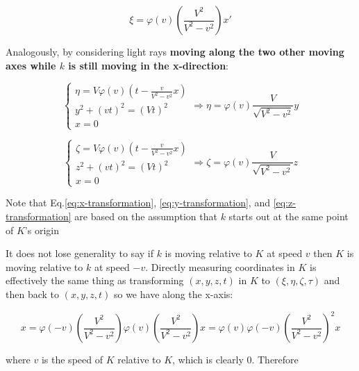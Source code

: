 \begin{equation}\label{eq:x-transformation}
    \xi = \varphi(v)\left( \frac{V^2}{V^2 - v^2} \right) x'
\end{equation}

Analogously, by considering light rays \textbf{moving along the two other moving axes while $k$ is still moving in the
x-direction}:

\begin{equation}\label{eq:y-transformation}
    \left\{
    \begin{array}{l}
        \eta = V\varphi(v)\left( t - \frac{v}{V^2 - v^2} x \right) \\
        y^2 + (vt)^2 = (Vt)^2 \\
        x = 0
    \end{array}
    \right.
    \Rightarrow
    \eta = \varphi(v)\frac{V}{\sqrt{V^2 - v^2}}y
\end{equation}

\begin{equation}\label{eq:z-transformation}
    \left\{
    \begin{array}{l}
        \zeta = V\varphi(v)\left( t - \frac{v}{V^2 - v^2} x \right) \\
        z^2 + (vt)^2 = (Vt)^2 \\
        x = 0
    \end{array}
    \right.
    \Rightarrow
    \zeta = \varphi(v)\frac{V}{\sqrt{V^2 - v^2}}z
\end{equation}

Note that Eq.\ref{eq:x-transformation}, \ref{eq:y-transformation}, and \ref{eq:z-transformation} are based on the
assumption that $k$ starts out at the same point of $K$'s origin

It does not lose generality to say if $k$ is moving relative to $K$ at speed $v$ then $K$ is moving relative to $k$ at
speed $-v$. Directly measuring coordinates in $K$ is effectively the same thing as transforming $(x, y, z, t)$ in $K$
to $(\xi, \eta, \zeta, \tau)$ and then back to $(x, y, z, t)$ so we have along the x-axis:

\begin{equation}
    x = \varphi(-v)\left( \frac{V^2}{V^2 - v^2} \right) \varphi(v)\left( \frac{V^2}{V^2 - v^2} \right) x = \varphi(v)\varphi(-v)\left( \frac{V^2}{V^2 - v^2} \right)^2 x
\end{equation}

where $v$ is the speed of $K$ relative to $K$, which is clearly 0. Therefore

